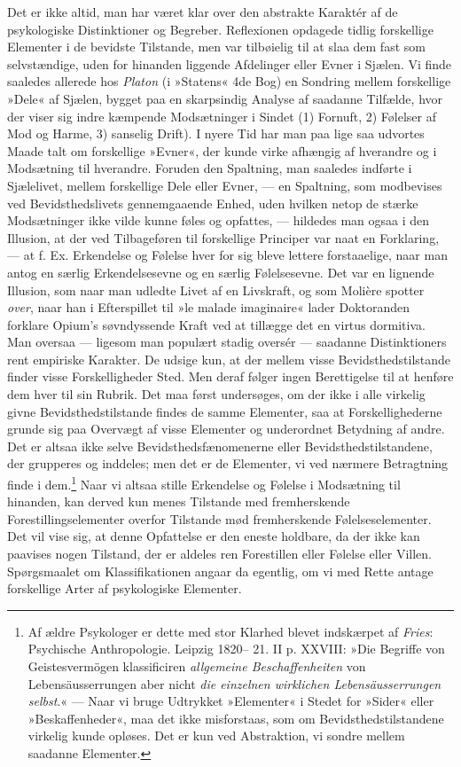 \documentclass[12pt,a4paper,openany]{book}
\newcommand{\opage}[1]{\marginnote{\footnotesize\textit{[#1]}}}
\begin{document}
Det er ikke altid, man har været klar over den abstrakte Karaktér af de
psykologiske Distinktioner og Begreber. Reflexionen opdagede tidlig
forskellige Elementer i de bevidste Tilstande, men var tilbøielig til at
slaa dem fast som selvstændige, uden for hinanden liggende Afdelinger
eller Evner i Sjælen. Vi finde saaledes allerede hos \emph{Platon} (i
»Statens« 4de Bog) en Sondring mellem forskellige »Dele« af Sjælen,
bygget paa en skarpsindig Analyse af saadanne Tilfælde, hvor der viser
sig indre kæmpende Modsætninger i Sindet (1) Fornuft, 2) Følelser af Mod
og Harme, 3) sanselig Drift). I nyere Tid
\opage{104}har man paa lige saa udvortes Maade talt om forskellige
»Evner«, der kunde virke afhængig af hverandre og i Modsætning til
hverandre. Foruden den Spaltning, man saaledes indførte i Sjælelivet,
mellem forskellige Dele eller Evner, --- en Spaltning, som modbevises
ved Bevidsthedslivets gennemgaaende Enhed, uden hvilken netop de stærke
Modsætninger ikke vilde kunne føles og opfattes, --- hildedes man ogsaa
i den Illusion, at der ved Tilbageføren til forskellige Principer var
naat en Forklaring, --- at f. Ex. Erkendelse og Følelse hver for sig
bleve lettere forstaaelige, naar man antog en særlig Erkendelsesevne og
en særlig Følelsesevne. Det var en lignende Illusion, som naar man
udledte Livet af en Livskraft, og som Molière spotter \emph{over}, naar
han i Efterspillet til »le malade imaginaire« lader Doktoranden forklare
Opium’s søvndyssende Kraft ved at tillægge det en virtus dormitiva. Man
oversaa --- ligesom man populært stadig oversér --- saadanne
Distinktioners rent empiriske Karakter. De udsige kun, at der mellem
visse Bevidsthedstilstande finder visse Forskelligheder Sted. Men deraf
følger ingen Berettigelse til at henføre dem hver til sin Rubrik. Det
maa først undersøges, om der ikke i alle virkelig givne
Bevidsthedstilstande findes de samme Elementer, saa at Forskellighederne
grunde sig paa Overvægt af visse Elementer og underordnet Betydning af
andre. Det er altsaa ikke selve Bevidsthedsfænomenerne eller
Bevidsthedstilstandene, der grupperes og inddeles; men det er de
Elementer, vi ved nærmere Betragtning finde i dem.\footnote[1]{Af ældre
Psykologer er dette med stor Klarhed blevet indskærpet af \emph{Fries}:
Psychische Anthropologie. Leipzig 1820-- 21. II p. XXVIII: »Die Begriffe
von Geistesvermögen klassificiren \emph{allgemeine Beschaffenheiten} von
Lebensäusserrungen aber nicht \emph{die einzelnen wirklichen
Lebensäusserrungen selbst}.« --- Naar vi bruge Udtrykket »Elementer« i
Stedet for »Sider« eller »Beskaffenheder«, maa det ikke misforstaas, som
om Bevidsthedstilstandene virkelig kunde opløses. Det er kun ved
Abstraktion, vi sondre mellem saadanne Elementer.} Naar vi altsaa stille
Erkendelse og Følelse i Modsætning til hinanden, kan derved kun menes
Tilstande med fremherskende Forestillingselementer overfor Tilstande mød
fremherskende Følelseselementer. Det vil vise sig, at denne Opfattelse
er den eneste holdbare, da der ikke kan paavises nogen Tilstand, der er
aldeles ren
\opage{105}Forestillen eller Følelse eller Villen. Spørgsmaalet om
Klassifikationen angaar da egentlig, om vi med Rette antage forskellige
Arter af psykologiske Elementer.
\end{document}
